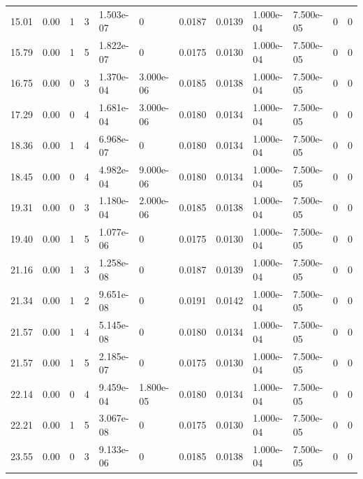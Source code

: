 \documentclass[preview]{standalone}
\begin{document}
{{\begin{tabular}{L{1.2cm}C{1.2cm} C{0.3cm}C{0.5cm} C{1.4cm}C{1.4cm} C{1.4cm}C{1.4cm} C{1.6cm}C{1.6cm} C{1.6cm}C{1.6cm}}
  15.01  &  0.00  & 1     &  3 &  1.503e-07  & 0  &  0.0187&   0.0139& 1.000e-04 & 7.500e-05   &  0 & 0  \\ 
  15.79  &  0.00  & 1     &  5 &  1.822e-07  & 0  &  0.0175&   0.0130& 1.000e-04 & 7.500e-05   &  0 & 0  \\ 
  16.75  &  0.00  & 0     &  3 &  1.370e-04  & 3.000e-06  &  0.0185&   0.0138& 1.000e-04 & 7.500e-05   &  0 & 0  \\ 
  17.29  &  0.00  & 0     &  4 &  1.681e-04  & 3.000e-06  &  0.0180&   0.0134& 1.000e-04 & 7.500e-05   &  0 & 0  \\ 
  18.36  &  0.00  & 1     &  4 &  6.968e-07  & 0  &  0.0180&   0.0134& 1.000e-04 & 7.500e-05   &  0 & 0  \\ 
  18.45  &  0.00  & 0     &  4 &  4.982e-04  & 9.000e-06  &  0.0180&   0.0134& 1.000e-04 & 7.500e-05   &  0 & 0  \\ 
  19.31  &  0.00  & 0     &  3 &  1.180e-04  & 2.000e-06  &  0.0185&   0.0138& 1.000e-04 & 7.500e-05   &  0 & 0  \\ 
  19.40  &  0.00  & 1     &  5 &  1.077e-06  & 0  &  0.0175&   0.0130& 1.000e-04 & 7.500e-05   &  0 & 0  \\ 
  21.16  &  0.00  & 1     &  3 &  1.258e-08  & 0  &  0.0187&   0.0139& 1.000e-04 & 7.500e-05   &  0 & 0  \\ 
  21.34  &  0.00  & 1     &  2 &  9.651e-08  & 0  &  0.0191&   0.0142& 1.000e-04 & 7.500e-05   &  0 & 0  \\ 
  21.57  &  0.00  & 1     &  4 &  5.145e-08  & 0  &  0.0180&   0.0134& 1.000e-04 & 7.500e-05   &  0 & 0  \\ 
  21.57  &  0.00  & 1     &  5 &  2.185e-07  & 0  &  0.0175&   0.0130& 1.000e-04 & 7.500e-05   &  0 & 0  \\ 
  22.14  &  0.00  & 0     &  4 &  9.459e-04  & 1.800e-05  &  0.0180&   0.0134& 1.000e-04 & 7.500e-05   &  0 & 0  \\ 
  22.21  &  0.00  & 1     &  5 &  3.067e-08  & 0  &  0.0175&   0.0130& 1.000e-04 & 7.500e-05   &  0 & 0  \\ 
  23.55  &  0.00  & 0     &  3 &  9.133e-06  & 0  &  0.0185&   0.0138& 1.000e-04 & 7.500e-05   &  0 & 0  \\ 
\hline 
\end{tabular} 

}}
\end{document}
